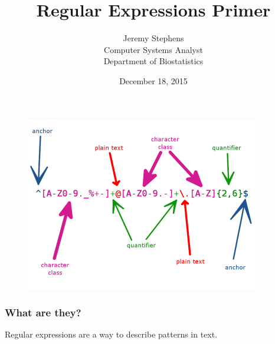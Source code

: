 \documentclass{beamer}
\begin{document}
\title{Regular Expressions Primer}
\author{Jeremy Stephens \\ Computer Systems Analyst \\ Department of Biostatistics}
\date{December 18, 2015}
\maketitle
\begin{frame}
  \begin{figure}[h]
    \centering
    \includegraphics[width=4in]{"email-regexp"}
  \end{figure}
\end{frame}
\begin{frame}
  \frametitle{What are they?}
  Regular expressions are a way to describe patterns in text.
\end{frame}
\end{document}
